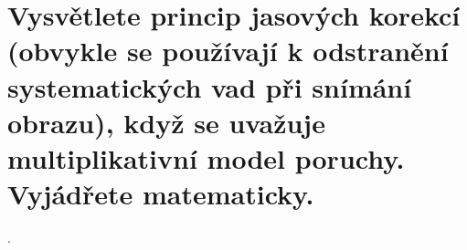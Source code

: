 \section{Vysvětlete princip jasových korekcí (obvykle se používají k odstranění systematických vad při snímání obrazu), 
když se uvažuje multiplikativní model poruchy. Vyjádřete matematicky.}.